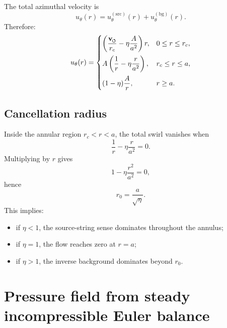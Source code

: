 \documentclass[11pt]{article}
\newcommand{\swirlarrow}{\mathchoice{\mkern-2mu\scriptstyle\boldsymbol{\circlearrowleft}}{\mkern-2mu\scriptstyle\boldsymbol{\circlearrowleft}}{\mkern-2mu\scriptscriptstyle\boldsymbol{\circlearrowleft}}{\mkern-2mu\scriptscriptstyle\boldsymbol{\circlearrowleft}}}
\newcommand{\vswirl}{\mathbf{v}_{\swirlarrow}}
\newcommand{\rc}{{r_c}}
\newcommand{\src}{\mathrm{src}}
\newcommand{\bg}{\mathrm{bg}}
\begin{document}
            The total azimuthal velocity is
            \begin{equation}
                u_\theta(r)=u_\theta^{(\src)}(r)+u_\theta^{(\bg)}(r).
                \label{eq:u-total}
            \end{equation}
            Therefore:
            \begin{equation}
                u_\theta(r)=
                \begin{cases}
                    \displaystyle \left(\frac{\vswirl}{\rc}-\eta \frac{A}{a^2}\right)r,
                    & 0\le r\le \rc, \\[1em]
                    \displaystyle A\left(\frac{1}{r}-\eta \frac{r}{a^2}\right),
                    & \rc \le r \le a, \\[1em]
                    \displaystyle (1-\eta)\frac{A}{r},
                    & r\ge a.
                \end{cases}
                \label{eq:u-total-piecewise}
            \end{equation}
        
        \subsection{Cancellation radius}
            
            Inside the annular region \(\rc<r<a\), the total swirl vanishes when
            \[
                \frac{1}{r}-\eta \frac{r}{a^2}=0.
            \]
            Multiplying by \(r\) gives
            \[
                1-\eta \frac{r^2}{a^2}=0,
            \]
            hence
            \begin{equation}
                \boxed{
                    r_0=\frac{a}{\sqrt{\eta}}.
                }
                \label{eq:r0}
            \end{equation}
            This implies:
            \begin{itemize}
                \item if \(\eta<1\), the source-string sense dominates throughout the annulus;
                \item if \(\eta=1\), the flow reaches zero at \(r=a\);
                \item if \(\eta>1\), the inverse background dominates beyond \(r_0\).
            \end{itemize}
        
        \section{Pressure field from steady incompressible Euler balance}
        
\end{document}

